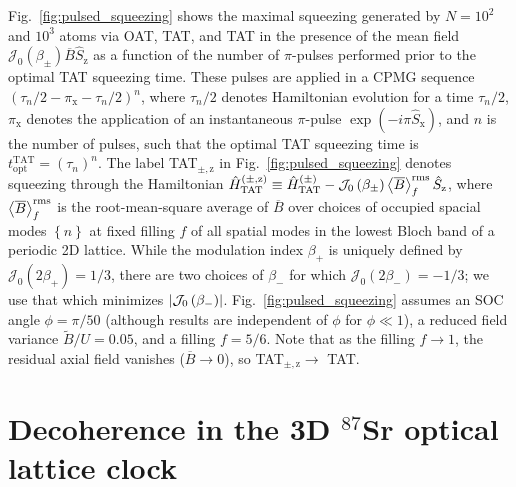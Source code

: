 \documentclass{nature}
\renewcommand{\t}{\text} %
\newcommand{\p}[1]{\left(#1\right)} %
\renewcommand{\set}[1]{\left\{#1\right\}} %
\newcommand{\bk}{\Braket}
\newcommand{\J}{\mathcal{J}}
\newcommand{\z}{\text{z}}
\newcommand{\x}{\text{x}}
\begin{document}
Fig.~\ref{fig:pulsed_squeezing} shows the maximal squeezing generated by $N=10^2$ and $10^3$ atoms via OAT, TAT, and TAT in the presence of the mean field $\J_0\p{\beta_\pm}\overline B\hat S_\z$ as a function of the number of $\pi$-pulses performed prior to the optimal TAT squeezing time.
These pulses are applied in a CPMG sequence $\p{\tau_n/2-\pi_\x-\tau_n/2}^n$, where $\tau_n/2$ denotes Hamiltonian evolution for a time $\tau_n/2$, $\pi_\x$ denotes the application of an instantaneous $\pi$-pulse $\exp\p{-i\pi\hat S_\x}$, and $n$ is the number of pulses, such that the optimal TAT squeezing time is $t_{\t{opt}}^{\t{TAT}}=\p{\tau_n}^n$.
The label TAT$_{\pm,\z}$ in Fig.~\ref{fig:pulsed_squeezing} denotes squeezing through the Hamiltonian $\hat H_{\t{TAT}}^{(\pm,\z)}\equiv \hat H_{\t{TAT}}^{(\pm)}-\J_0\p{\beta_\pm}\bk{\overline B}^{\t{rms}}_f\hat S_\z$, where $\bk{\overline B}^{\t{rms}}_f$ is the root-mean-square average of $\overline B$ over choices of occupied spacial modes $\set{n}$ at fixed filling $f$ of all spatial modes in the lowest Bloch band of a periodic 2D lattice.
While the modulation index $\beta_+$ is uniquely defined by $\J_0\p{2\beta_+}=1/3$, there are two choices of $\beta_-$ for which $\J_0\p{2\beta_-}=-1/3$; we use that which minimizes $\abs{\J_0\p{\beta_-}}$.
Fig.~\ref{fig:pulsed_squeezing} assumes an SOC angle $\phi=\pi/50$ (although results are independent of $\phi$ for $\phi\ll1$), a reduced field variance $\widetilde{B}/U=0.05$, and a filling $f=5/6$.
Note that as the filling $f\to1$, the residual axial field vanishes ($\overline{B}\to0$), so TAT$_{\pm,\z}\to$ TAT.


\section*{Decoherence in the 3D $^{87}$Sr optical lattice clock}
\end{document}
